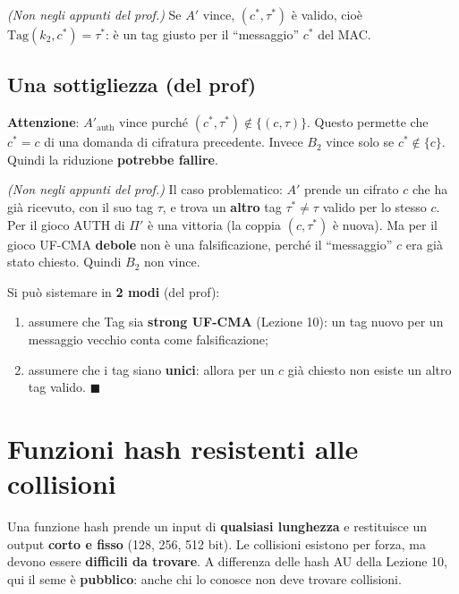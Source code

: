 \emph{(Non negli appunti del prof.)} Se \(A'\) vince, \((c^*, \tau^*)\) è valido, cioè \(\text{Tag}(k_2, c^*) = \tau^*\): è un tag giusto per il ``messaggio'' \(c^*\) del MAC.

\subsection{Una sottigliezza (del prof)}

\textbf{Attenzione}: \(A'_{\text{auth}}\) vince purché \((c^*, \tau^*) \notin \{(c, \tau)\}\). Questo permette che \(c^* = c\) di una domanda di cifratura precedente. Invece \(B_2\) vince solo se \(c^* \notin \{c\}\). Quindi la riduzione \textbf{potrebbe fallire}.

\begin{nota}
\emph{(Non negli appunti del prof.)} Il caso problematico: \(A'\) prende un cifrato \(c\) che ha già ricevuto, con il suo tag \(\tau\), e trova un \textbf{altro} tag \(\tau^* \ne \tau\) valido per lo stesso \(c\). Per il gioco AUTH di \(\Pi'\) è una vittoria (la coppia \((c, \tau^*)\) è nuova). Ma per il gioco UF-CMA \textbf{debole} non è una falsificazione, perché il ``messaggio'' \(c\) era già stato chiesto. Quindi \(B_2\) non vince.
\end{nota}

Si può sistemare in \textbf{2 modi} (del prof):
\begin{enumerate}
  \item assumere che Tag sia \textbf{strong UF-CMA} (Lezione 10): un tag nuovo per un messaggio vecchio conta come falsificazione;
  \item assumere che i tag siano \textbf{unici}: allora per un \(c\) già chiesto non esiste un altro tag valido. \(\blacksquare\)
\end{enumerate}

\section{Funzioni hash resistenti alle collisioni}

\begin{inbreve}
Una funzione hash prende un input di \textbf{qualsiasi lunghezza} e restituisce un output \textbf{corto e fisso} (128, 256, 512 bit). Le collisioni esistono per forza, ma devono essere \textbf{difficili da trovare}. A differenza delle hash AU della Lezione 10, qui il seme è \textbf{pubblico}: anche chi lo conosce non deve trovare collisioni.
\end{inbreve}

